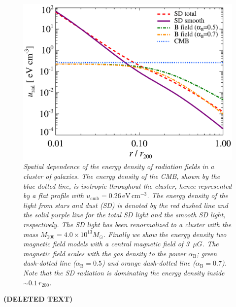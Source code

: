 \documentclass[10pt,aps,pra,reprint,amsmath,amsfonts,amssymb,showpacs]{revtex4-1}
\def\del#1{{\bf (DELETED TEXT)}}
\newcommand{\rmn}{\mathrm}
\newcommand{\msun}{M_\odot}
\newcommand{\rvir}{r_{200}}
\newcommand{\mvir}{M_{200}}
\begin{document}
\begin{figure}%
 \includegraphics[width=0.99\columnwidth]{figures/ucool.eps}
 \caption{\it Spatial dependence of the energy density of radiation
   fields in a cluster of galaxies. The energy density of the CMB,
   shown by the blue dotted line, is isotropic throughout the cluster,
   hence represented by a flat profile with
   $u_\rmn{cmb}=0.26\,\rmn{eV}\,\rmn{cm}^{-3}$. The energy density of
   the light from stars and dust (SD) is denoted by the red dashed
   line and the solid purple line for the total SD light and the
   smooth SD light, respectively. The SD light has been renormalized
   to a cluster with the mass $\mvir=4.0\times10^{13}\msun$. Finally we
   show the energy density two magnetic field models with a central
   magnetic field of 3~$\mu G$. The magnetic field scales with the gas
   density to the power $\alpha_\rmn{B}$; green dash-dotted line
   ($\alpha_\rmn{B}=0.5$) and orange dash-dotted line
   ($\alpha_\rmn{B}=0.7$). Note that the SD radiation is dominating
   the energy density inside $\sim0.1\,\rvir$.}
 \label{fig:SD_Edens}
\end{figure}


\del{In this section we present the formalism for the different
galaxy cluster emission components and show their contribution to the
total dark matter gamma-ray spectrum. We account for the emission
radiated both by final state radiation and inverse Compton where we
allow for upscattering through CMB, starlight, and dust.}


\end{document}
